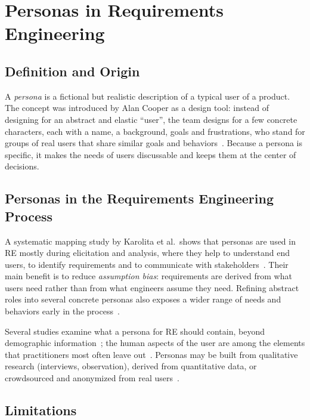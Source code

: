\section{Personas in Requirements Engineering}
\label{sec:bg-personas}

\subsection{Definition and Origin}
\label{sec:bg-persona-definition}

A \emph{persona} is a fictional but realistic description of a typical user of a product. The concept was introduced by Alan Cooper as a design tool: instead of designing for an abstract and elastic ``user'', the team designs for a few concrete characters, each with a name, a background, goals and frustrations, who stand for groups of real users that share similar goals and behaviors~\cite{cooper2004inmates}. Because a persona is specific, it makes the needs of users discussable and keeps them at the center of decisions.

\subsection{Personas in the Requirements Engineering Process}
\label{sec:bg-persona-re}

A systematic mapping study by Karolita et al.\ shows that personas are used in RE mostly during elicitation and analysis, where they help to understand end users, to identify requirements and to communicate with stakeholders~\cite{karolita2023personas}. Their main benefit is to reduce \emph{assumption bias}: requirements are derived from what users need rather than from what engineers assume they need. Refining abstract roles into several concrete personas also exposes a wider range of needs and behaviors early in the process~\cite{sim2014empowering}.

Several studies examine what a persona for RE should contain, beyond demographic information~\cite{karolita2023what}; the human aspects of the user are among the elements that practitioners most often leave out~\cite{wang2025personas}. Personas may be built from qualitative research (interviews, observation), derived from quantitative data, or crowdsourced and anonymized from real users~\cite{alvertis2016using}.

\subsection{Limitations}
\label{sec:bg-persona-limitations}

